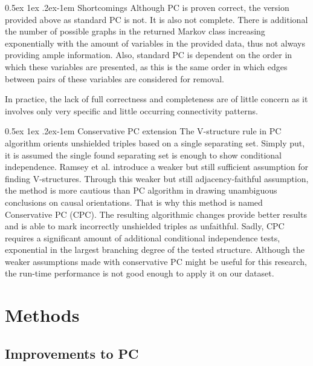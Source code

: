 \documentclass[a4paper, 10pt, english, onecolumn]{article}
\makeatletter
\renewcommand{\paragraph}{%
  \@startsection{paragraph}{4}%
  {\z@}{0.5ex \@plus 1ex \@minus .2ex}{-1em}%
  {\normalfont\normalsize\bfseries}%
}
\makeatother
\begin{document}
\paragraph{Shortcomings}
Although PC is proven correct, the version provided above as standard PC is not.
It is also not complete.
There is additional the number of possible graphs in the returned Markov class increasing exponentially with the amount of variables in the provided data, thus not always providing ample information.
Also, standard PC is dependent on the order in which these variables are presented, as this is the same order in which edges between pairs of these variables are considered for removal\cite[p.88]{spirtes2000}.

In practice, the lack of full correctness and completeness are of little concern as it involves only very specific and little occurring connectivity patterns\cite[p.127-130]{spirtes2000}.

\paragraph{Conservative PC extension}
The V-structure rule in PC algorithm orients unshielded triples based on a single separating set. 
Simply put, it is assumed the single found separating set is enough to show conditional independence. 
Ramsey et al. \cite{ramsey2012} introduce a weaker but still sufficient assumption for finding V-structures.
Through this weaker but still adjacency-faithful assumption, the method is more cautious than PC algorithm in drawing unambiguous conclusions on causal orientations.
That is why this method is named Conservative PC (CPC).
The resulting algorithmic changes provide better results and is able to mark incorrectly unshielded triples as unfaithful.
Sadly, CPC requires a significant amount of additional conditional independence tests, exponential in the largest branching degree of the tested structure.
Although the weaker assumptions made with conservative PC might be useful for this research, the run-time performance is not good enough to apply it on our dataset.

\section{Methods}%
\subsection{Improvements to PC}
\end{document}
